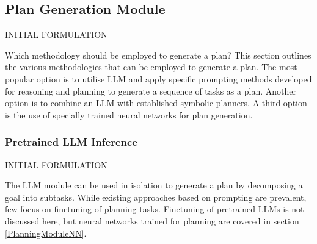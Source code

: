 \documentclass{article}
\begin{document}


\FloatBarrier
\subsection{Plan Generation Module}
INITIAL FORMULATION

Which methodology should be employed to generate a plan? This section outlines the various methodologies that can be employed to generate a plan. The most popular option is to utilise LLM and apply specific prompting methods developed for reasoning and planning to generate a sequence of tasks as a plan. Another option is to combine an LLM with established symbolic planners. A third option is the use of specially trained neural networks for plan generation.


\subsubsection{Pretrained LLM Inference}
INITIAL FORMULATION

The LLM module can be used in isolation to generate a plan by decomposing a goal into subtasks. While existing approaches based on prompting are prevalent, few focus on finetuning of planning tasks. Finetuning of pretrained LLMs is not discussed here, but neural networks trained for planning are covered in section \ref{PlanningModuleNN}.
\end{document}
